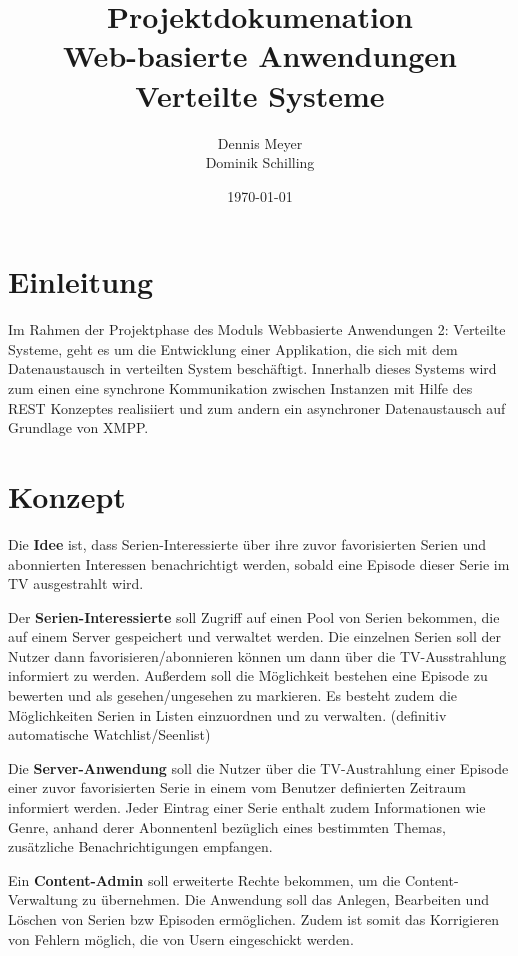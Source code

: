 \documentclass[a4paper]{article}
\title{Projektdokumenation\\Web-basierte Anwendungen\\Verteilte Systeme}
\author{Dennis Meyer\\Dominik Schilling}
\date{\today}
\begin{document}
\maketitle

\newpage

\tableofcontents

\newpage


\section{Einleitung}
Im Rahmen der Projektphase des Moduls Webbasierte Anwendungen 2: Verteilte Systeme, geht es um die Entwicklung einer Applikation, die sich mit dem Datenaustausch in verteilten System beschäftigt. Innerhalb dieses Systems wird zum einen eine synchrone Kommunikation zwischen Instanzen mit Hilfe des REST Konzeptes realisiiert und zum andern ein asynchroner Datenaustausch auf Grundlage von XMPP.


\section{Konzept}

Die \textbf{Idee} ist, dass Serien-Interessierte über ihre zuvor favorisierten Serien und abonnierten Interessen benachrichtigt werden, sobald eine Episode dieser Serie im TV ausgestrahlt wird.

\parskip 12pt
\parindent 0pt
Der \textbf{Serien-Interessierte} soll Zugriff auf einen Pool von Serien bekommen, die auf einem Server gespeichert und verwaltet werden.
Die einzelnen Serien soll der Nutzer dann favorisieren/abonnieren können um dann über die TV-Ausstrahlung informiert zu werden.
Außerdem soll die Möglichkeit bestehen eine Episode zu bewerten und als gesehen/ungesehen zu markieren. Es besteht zudem die Möglichkeiten Serien in Listen einzuordnen und zu verwalten. (definitiv automatische Watchlist/Seenlist)

\parskip 12pt
\parindent 0pt
Die \textbf{Server-Anwendung} soll die Nutzer über die TV-Austrahlung einer Episode einer zuvor favorisierten Serie in einem vom Benutzer definierten Zeitraum informiert werden. Jeder Eintrag einer Serie enthalt zudem Informationen wie Genre, anhand derer Abonnentenl bezüglich eines bestimmten Themas, zusätzliche Benachrichtigungen empfangen.

\parskip 12pt
\parindent 0pt
Ein \textbf{Content-Admin} soll erweiterte Rechte bekommen, um die Content-Verwaltung zu übernehmen. Die Anwendung soll das Anlegen, Bearbeiten und Löschen von Serien bzw Episoden ermöglichen. Zudem ist somit das Korrigieren von Fehlern möglich, die von Usern eingeschickt werden.
\end{document}

